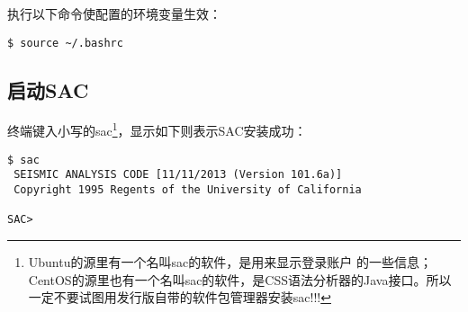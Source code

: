 执行以下命令使配置的环境变量生效：
\begin{lstlisting}[style=Shell]
$ source ~/.bashrc
\end{lstlisting}

\subsection*{启动SAC}
终端键入小写的sac\footnote{Ubuntu的源里有一个名叫sac的软件，是用来显示登录账户
的一些信息；CentOS的源里也有一个名叫sac的软件，是CSS语法分析器的Java接口。所以
一定不要试图用发行版自带的软件包管理器安装sac!!!}，显示如下则表示SAC安装成功：
\begin{lstlisting}[style=Shell]
$ sac
 SEISMIC ANALYSIS CODE [11/11/2013 (Version 101.6a)]
 Copyright 1995 Regents of the University of California

SAC> 
\end{lstlisting}
